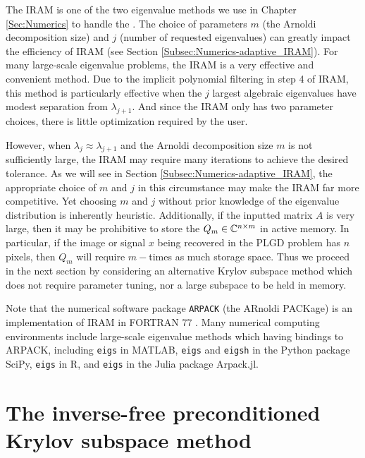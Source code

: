 \begin{enumerate}
\begin{algorithm}[H]
\end{algorithm}


The IRAM is one of the two eigenvalue methods we use in Chapter \ref{Sec:Numerics} to handle the \emep.  The choice of parameters $m$ (the Arnoldi decomposition size) and $j$ (number of requested eigenvalues) can greatly impact the efficiency of IRAM (see Section \ref{Subsec:Numerics-adaptive_IRAM}).  For many large-scale eigenvalue problems, the IRAM is a very effective and convenient method.  Due to the implicit polynomial filtering in step 4 of IRAM, this method is particularly effective when the $j$ largest algebraic eigenvalues have modest separation from $\lambda_{j+1}$.  And since the IRAM only has two parameter choices, there is little optimization required by the user.

However, when $\lambda_j \approx \lambda_{j+1}$ and the Arnoldi decomposition size $m$ is not sufficiently large, the IRAM may require many iterations to achieve the desired tolerance.  As we will see in Section \ref{Subsec:Numerics-adaptive_IRAM}, the appropriate choice of $m$ and $j$ in this circumstance may make the IRAM far more competitive.  Yet choosing $m$ and $j$ without prior knowledge of the eigenvalue distribution is inherently heuristic.  Additionally, if the inputted matrix $A$ is very large, then it may be prohibitive to store the $Q_m \in {\mathbb C}^{n \times m}$ in active memory.  In particular, if the image or signal $x$ being recovered in the PLGD problem has $n$ pixels, then $Q_m$ will require $m-$times as much storage space.  Thus we proceed in the next section by considering an alternative Krylov subspace method which does not require parameter tuning, nor a large subspace to be held in memory.


Note that the numerical software package \texttt{ARPACK} (the ARnoldi PACKage) is an implementation of IRAM in FORTRAN 77 \cite{lehoucq1998arpack}.  Many numerical computing environments include large-scale eigenvalue methods which having bindings to ARPACK, including \texttt{eigs} in MATLAB, \texttt{eigs} and \texttt{eigsh} in the Python package SciPy, \texttt{eigs} in R, and \texttt{eigs} in the Julia package Arpack.jl. 


\end{enumerate}








\section{The inverse-free preconditioned Krylov subspace method} 	\label{Subsec:evol_mats-eigifp}


